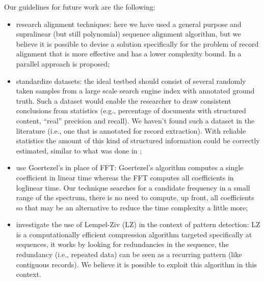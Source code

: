 \documentclass{vldb}
\begin{document}
Our guidelines for future work are the following:
\begin{itemize}
  \item research alignment techniques: here we have used a general purpose and
  supralinear (but still polynomial) sequence alignment algorithm, but we
  believe it is possible to devise a solution specifically for the problem of
  record alignment that is more effective and has a lower complexity bound. In
  \cite{gfrerer2017parallel} a parallel approach is proposed;
  \item standardize datasets: the ideal testbed should consist of several
  randomly taken samples from a large scale search engine index with annotated
  ground truth.
  Such a dataset would enable the researcher to draw consistent conclusions
  from statistics (e.g., percentage of documents with structured content,
  ``real'' precision and recall). We haven't found such a dataset in the
  literature (i.e., one that is annotated for record extraction). With reliable
  statistics the amount of this kind of structured information could be
  correctly estimated, similar to what was done in \cite{webtables2008};
  \item use Goertezel's \cite{goertzel1958algorithm} in place of FFT:
  Goertezel's algorithm computes a single coefficient in linear time whereas the
  FFT computes all coefficients in loglinear time. Our technique searches for a
  candidate frequency in a small range of the spectrum, there is no need to
  compute, up front, all coefficients so that may be an alternative to reduce
  the time complexity a little more;
  \item investigate the use of Lempel-Ziv\cite{ziv1977universal} (LZ) in the
  context of pattern detection: LZ is a computationally efficient compression
  algorithm targeted specifically at sequences, it works by looking for
  redundancies in the sequence, the redundancy (i.e., repeated data) can be seen
  as a recurring pattern (like contiguous records). We believe it is
  possible to exploit this algorithm in this context.
\end{itemize}
 


\end{document}
